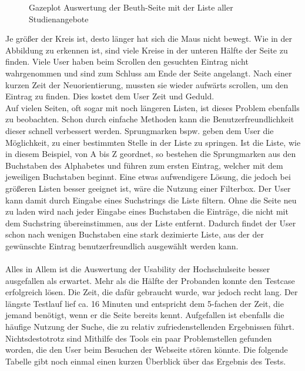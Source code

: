 \begin{center}
\end{center}
\begin{figure}[htb]
   \centering
   \caption{Gazeplot Auswertung der Beuth-Seite mit der Liste aller Studienangebote}
    \label{gazeplotCourses}
\end{figure}

Je größer der Kreis ist, desto länger hat sich die Maus nicht bewegt. Wie in der Abbildung zu erkennen ist, sind viele Kreise in der unteren Hälfte der Seite zu finden. Viele User haben beim Scrollen den gesuchten Eintrag nicht wahrgenommen und sind zum Schluss am Ende der Seite angelangt. Nach einer kurzen Zeit der Neuorientierung, mussten sie wieder aufwärts scrollen, um den Eintrag zu finden. Dies kostet dem User Zeit und Geduld.\\
Auf vielen Seiten, oft sogar mit noch längeren Listen, ist dieses Problem ebenfalls zu beobachten. Schon durch einfache Methoden kann die Benutzerfreundlichkeit dieser schnell verbessert werden. Sprungmarken bspw. geben dem User die Möglichkeit, zu einer bestimmten Stelle in der Liste zu \glqq springen\grqq{}. Ist die Liste, wie in diesem Beispiel, von A bis Z geordnet, so bestehen die Sprungmarken aus den Buchstaben des Alphabetes und führen zum ersten Eintrag, welcher mit dem jeweiligen Buchstaben beginnt. Eine etwas aufwendigere Lösung, die jedoch bei größeren Listen besser geeignet ist, wäre die Nutzung einer Filterbox. Der User kann damit durch Eingabe eines Suchstrings die Liste filtern. Ohne die Seite neu zu laden wird nach jeder Eingabe eines Buchstaben die Einträge, die nicht mit dem Suchstring übereinstimmen, aus der Liste entfernt. Dadurch findet der User schon nach wenigen Buchstaben eine stark dezimierte Liste, aus der der gewünschte Eintrag benutzerfreundlich ausgewählt werden kann.\\
\\
Alles in Allem ist die Auswertung der Usability der Hochschulseite besser ausgefallen als erwartet. Mehr als die Hälfte der Probanden konnte den Testcase erfolgreich lösen. Die Zeit, die dafür gebraucht wurde, war jedoch recht lang. Der längste Testlauf lief ca. 16 Minuten und entspricht dem 5-fachen der Zeit, die jemand benötigt, wenn er die Seite bereits kennt. Aufgefallen ist ebenfalls die häufige Nutzung der Suche, die zu relativ zufriedenstellenden Ergebnissen führt. Nichtsdestotrotz sind Mithilfe des Tools ein paar Problemstellen gefunden worden, die den User beim Besuchen der Webseite stören könnte. Die folgende Tabelle gibt noch einmal einen kurzen Überblick über das Ergebnis des Tests.\\
